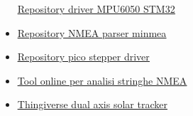 \begin{itemize}
  \href{https://github.com/Harinadha/STM32_MPU6050lib/blob/master/MPU6050.h}{\underline{Repository
  driver MPU6050 STM32}}
  
\item
  
  \href{https://github.com/kosma/minmea}{\underline{Repository NMEA
  parser minmea}}
  
\item
  
  \href{https://github.com/beshrkayali/pico_stepper}{\underline{Repository
  pico stepper driver}}
  
\item
  
  \href{https://swairlearn.bluecover.pt/nmea_analyser}{\underline{Tool
  online per analisi stringhe NMEA}}
  
\item
  
  \href{https://www.thingiverse.com/thing:53321}{\underline{Thingiverse
  dual axis solar tracker}}
  
\end{itemize}

